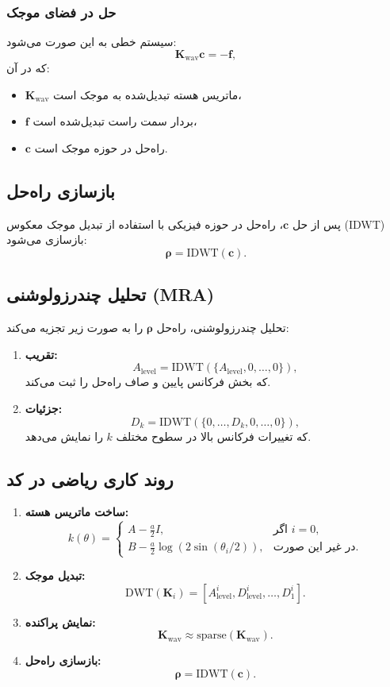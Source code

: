 \documentclass[12pt,a4paper]{article}
\begin{document}
\subsubsection{حل در فضای موجک}
سیستم خطی به این صورت می‌شود:
\[
    \mathbf{K}_\text{wav} \mathbf{c} = -\mathbf{f},
\]
که در آن:
\begin{itemize}
    \item \(\mathbf{K}_\text{wav}\) ماتریس هسته تبدیل‌شده به موجک است،
    \item \(\mathbf{f}\) بردار سمت راست تبدیل‌شده است،
    \item \(\mathbf{c}\) راه‌حل در حوزه موجک است.
\end{itemize}

\subsection{بازسازی راه‌حل}
پس از حل \(\mathbf{c}\)، راه‌حل در حوزه فیزیکی با استفاده از تبدیل موجک معکوس (IDWT) بازسازی می‌شود:
\[
    \boldsymbol{\rho} = \text{IDWT}(\mathbf{c}).
\]
\subsection{تحلیل چندرزولوشنی (MRA)}
تحلیل چندرزولوشنی، راه‌حل \(\boldsymbol{\rho}\) را به صورت زیر تجزیه می‌کند:
\begin{enumerate}
    \item \textbf{تقریب:}
          \[
              A_\text{level} = \text{IDWT}(\{A_\text{level}, 0, \dots, 0\}),
          \]
          که بخش فرکانس پایین و صاف راه‌حل را ثبت می‌کند.
    \item \textbf{جزئیات:}
          \[
              D_k = \text{IDWT}(\{0, \dots, D_k, 0, \dots, 0\}),
          \]
          که تغییرات فرکانس بالا در سطوح مختلف \(k\) را نمایش می‌دهد.
\end{enumerate}

\subsection{روند کاری ریاضی در کد}
\begin{enumerate}
    \item \textbf{ساخت ماتریس هسته:}
          \[
              k(\theta) =
              \begin{cases}
                  A - \frac{a}{2}I,                           & \text{اگر } i = 0, \\
                  B - \frac{a}{2} \log(2 \sin(\theta_i / 2)), & \text{در غیر این صورت}.
              \end{cases}
          \]
    \item \textbf{تبدیل موجک:}
          \[
              \text{DWT}(\mathbf{K}_i) = [A_\text{level}^i, D_\text{level}^i, \dots, D_1^i].
          \]
    \item \textbf{نمایش پراکنده:}
          \[
              \mathbf{K}_\text{wav} \approx \text{sparse}(\mathbf{K}_\text{wav}).
          \]
    \item \textbf{بازسازی راه‌حل:}
          \[
              \boldsymbol{\rho} = \text{IDWT}(\mathbf{c}).
          \]
\end{enumerate}
\end{document}
